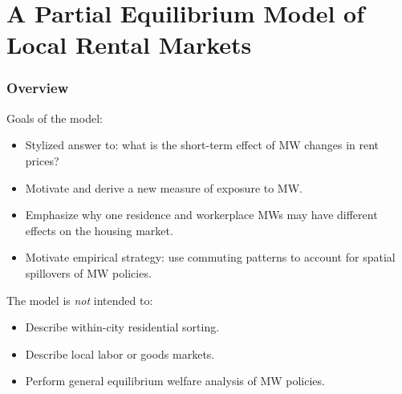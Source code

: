\documentclass[aspectratio=169, t]{beamer}
\begin{document}
\section{A Partial Equilibrium Model of Local Rental Markets}

\begin{frame}
    \frametitle{Overview}
    
    Goals of the model:
	\begin{itemize}
		\item Stylized answer to: what is the short-term effect of MW changes in rent prices?
		\item Motivate and derive a new measure of exposure to MW.
		\item Emphasize why one residence and workerplace MWs may have different effects on the housing market.
		\item Motivate empirical strategy: use commuting patterns to account for spatial spillovers of MW policies.
	\end{itemize}
	
	\pause
	\vspace{2mm}
	The model is \textit{not} intended to:
	\begin{itemize}
		\item Describe within-city residential sorting.
		\item Describe local labor or goods markets.
		\item Perform general equilibrium welfare analysis of MW policies.
	\end{itemize}
\end{frame}
\end{document}

